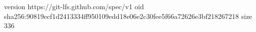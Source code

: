 version https://git-lfs.github.com/spec/v1
oid sha256:90819ecf1d2413334ff950109edd18e06e2c30fee5f66a72626e3bf218267218
size 336
